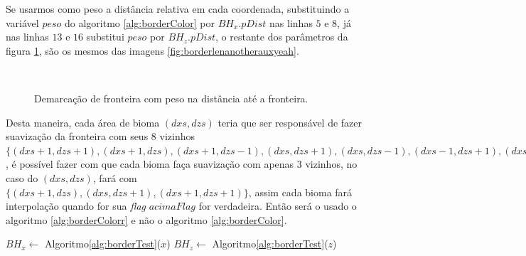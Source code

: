 Se usarmos como peso a distância relativa em cada coordenada, substituindo a variável
$peso$ do algoritmo \ref{alg:borderColor} por $BH_{x}.pDist$ nas linhas $5$ e $8$, já
nas linhas $13$ e $16$ substitui $peso$ por $BH_{z}.pDist$, o restante dos parâmetros
da figura \ref{fig:borderlenanotherauxyeahp}, são os mesmos das imagens \ref{fig:borderlenanotherauxyeah}.

\begin{figure}[H]
     \centering
     \hspace{0.1cm}
     \\
     \caption{Demarcação de fronteira com peso na distância até a fronteira.}
     
     \label{fig:borderlenanotherauxyeahp}
\end{figure}

Desta maneira, cada área de bioma $(dxs, dzs)$ teria que ser responsável de fazer suavização da 
fronteira com seus $8$ vizinhos 
$\{(dxs+1, dzs+1), (dxs+1, dzs), (dxs+1, dzs-1), (dxs, dzs+1), (dxs, dzs-1), (dxs-1, dzs+1), (dxs-1, dzs), (dxs-1, dzs-1)\}$
, é possível fazer com que cada bioma faça suavização com apenas 3 vizinhos, no caso do 
$(dxs, dzs)$, fará com $\{(dxs+1, dzs), (dxs, dzs+1), (dxs+1, dzs+1)\}$, assim cada 
bioma fará interpolação quando for sua \textit{flag} $acimaFlag$ for verdadeira. Então
será o usado o algoritmo \ref{alg:borderColorr} e não o algoritmo \ref{alg:borderColor}.

\begin{algorithm}[H]\label{alg:borderColorr}%
    $BH_{x} \leftarrow$ Algoritmo\ref{alg:borderTest}($x$)\;
    $BH_{z} \leftarrow$ Algoritmo\ref{alg:borderTest}($z$)\;
    
    
    \caption{Colorindo fronteira apenas acima.}
\end{algorithm}

